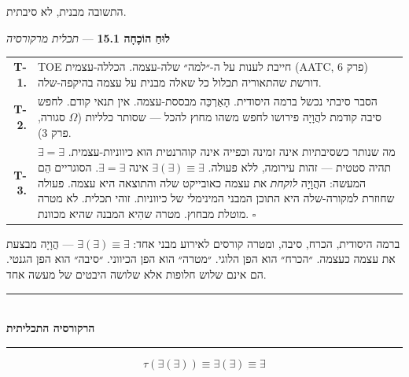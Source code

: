 \documentclass[10pt, openany, oneside]{book}
\renewcommand{\normalsize}{\fontsize{10}{13}\selectfont}
\renewcommand{\footnotesize}{\fontsize{8.5}{11}\selectfont}
\begin{document}
התשובה מבנית, לא סיבתית.

\vspace{0.5em}

\textbf{לוּחַ הוֹכָחָה 15.1} --- \textit{תכלית מרקורסיה}

\vspace{0.5em}

{\footnotesize
\noindent\begin{tabular}{r p{}}
\textbf{T-1.} & TOE חייבת לענות על ה-״למה״ שלה-עצמה. הכללה-עצמית (AATC, פרק 6) דורשת שהתאוריה תכלול כל שאלה מבנית על עצמה בהיקפה-שלה. \\[0.3em]
\textbf{T-2.} & הסבר סיבתי נכשל ברמה היסודית. הָאַרְכֵּה מבססת-עצמה. אין תנאי קודם. לחפש סיבה קודמת להֲוָיָה פירושו לחפש משהו מחוץ להכל — שסותר כלליות ($\Omega$ סגורה, פרק 3). \\[0.3em]
\textbf{T-3.} & מה שנותר כשסיבתיות אינה זמינה וכפייה אינה קוהרנטית הוא כיווניות-עצמית. $\exists = \exists$ תהיה סטטית — זהות עירומה, ללא פעולה. $\exists(\exists) \equiv \exists$ אינה $\exists = \exists$. הסוגריים הֵם המעשה: ההֲוָיָה \textit{לוקחת} את עצמה כאובייקט שלה והתוצאה היא עצמה. פעולה שחוזרת למקורה-שלה היא התוכן המבני המינימלי של כיווניות. זוהי תכלית. לא מטרה מוטלת מבחוץ. מטרה שהִיא המבנה שהיא מכוונת. $\square$ \\[0.3em]
\end{tabular}
}

\vspace{0.8em}

\noindent ברמה היסודית, הכרח, סיבה, ומטרה קורסים לאירוע מבני אחד: $\exists(\exists) \equiv \exists$ — הֲוָיָה מבצעת את עצמה כעצמה. ״הכרח״ הוא הפן הלוגי. ״מטרה״ הוא הפן הכיווני. ״סיבה״ הוא הפן הגנטי. הם אינם שלוש חלופות אלא שלושה היבטים של מעשה אחד.

\vspace{1.5em}


\begin{center}
    \rule{0.3\textwidth}{0.4pt}\\[0.5em]
    {\normalsize\bfseries\textsc{הרקורסיה התכליתית}}\\[0.3em]
    \rule{0.3\textwidth}{0.4pt}
\end{center}

\vspace{1em}

$$\tau(\exists(\exists)) \equiv \exists(\exists) \equiv \exists$$
\end{document}

